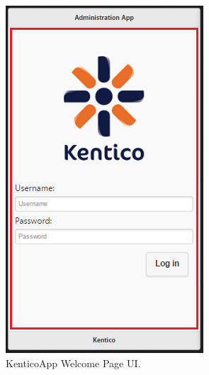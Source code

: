 \begin{figure}
  \includegraphics[width=\textwidth/2]{Images/WelcomePageIllustration.png}
  \caption{KenticoApp Welcome Page UI.}
  \label{WelcomePageIllustration}
\end{figure}
